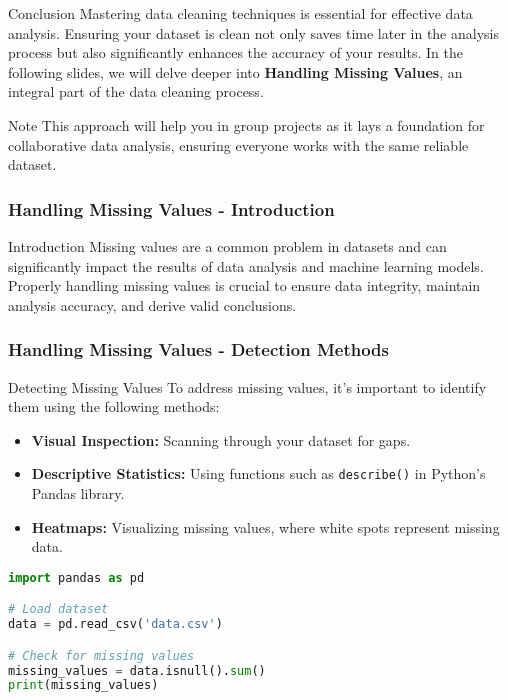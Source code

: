 \documentclass[aspectratio=169]{beamer}
\begin{document}
\begin{frame}[fragile]{Conclusion}
    Mastering data cleaning techniques is essential for effective data analysis. Ensuring your dataset is clean not only saves time later in the analysis process but also significantly enhances the accuracy of your results. In the following slides, we will delve deeper into \textbf{Handling Missing Values}, an integral part of the data cleaning process.
\end{frame}

\begin{frame}[fragile]{Note}
    This approach will help you in group projects as it lays a foundation for collaborative data analysis, ensuring everyone works with the same reliable dataset.
\end{frame}

\begin{frame}[fragile]
    \frametitle{Handling Missing Values - Introduction}
    \begin{block}{Introduction}
        Missing values are a common problem in datasets and can significantly impact the results of data analysis and machine learning models. Properly handling missing values is crucial to ensure data integrity, maintain analysis accuracy, and derive valid conclusions.
    \end{block}
\end{frame}

\begin{frame}[fragile]
    \frametitle{Handling Missing Values - Detection Methods}
    \begin{block}{Detecting Missing Values}
        To address missing values, it's important to identify them using the following methods:
        \begin{itemize}
            \item \textbf{Visual Inspection:} Scanning through your dataset for gaps.
            \item \textbf{Descriptive Statistics:} Using functions such as \texttt{describe()} in Python's Pandas library.
            \item \textbf{Heatmaps:} Visualizing missing values, where white spots represent missing data.
        \end{itemize}
    \end{block}
    
    \begin{lstlisting}[language=Python]
import pandas as pd

# Load dataset
data = pd.read_csv('data.csv')

# Check for missing values
missing_values = data.isnull().sum()
print(missing_values)
    \end{lstlisting}
\end{frame}
\end{document}
